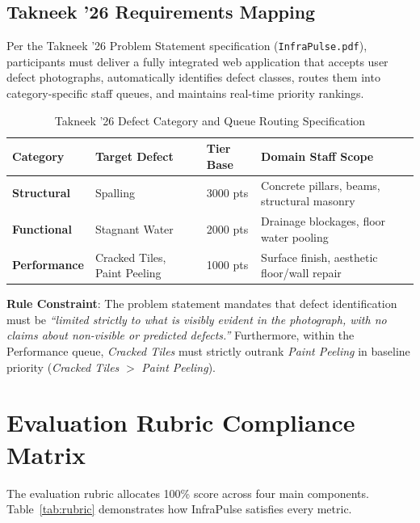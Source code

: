 \documentclass[11pt,a4paper]{article}
\begin{document}
\subsection{Takneek '26 Requirements Mapping}
Per the Takneek '26 Problem Statement specification (\texttt{InfraPulse.pdf}), participants must deliver a fully integrated web application that accepts user defect photographs, automatically identifies defect classes, routes them into category-specific staff queues, and maintains real-time priority rankings.

\begin{table}[H]
\centering
\caption{Takneek '26 Defect Category and Queue Routing Specification}
\label{tab:ps_spec}
\begin{tabular}{llll}
\toprule
\textbf{Category} & \textbf{Target Defect} & \textbf{Tier Base} & \textbf{Domain Staff Scope} \\
\midrule
\textbf{Structural} & Spalling & 3000 pts & Concrete pillars, beams, structural masonry \\
\textbf{Functional} & Stagnant Water & 2000 pts & Drainage blockages, floor water pooling \\
\textbf{Performance} & Cracked Tiles, Paint Peeling & 1000 pts & Surface finish, aesthetic floor/wall repair \\
\bottomrule
\end{tabular}
\end{table}

\textbf{Rule Constraint}: The problem statement mandates that defect identification must be \textit{``limited strictly to what is visibly evident in the photograph, with no claims about non-visible or predicted defects.''} Furthermore, within the Performance queue, \textit{Cracked Tiles} must strictly outrank \textit{Paint Peeling} in baseline priority (\textit{Cracked Tiles} $>$ \textit{Paint Peeling}).

\section{Evaluation Rubric Compliance Matrix}

The evaluation rubric allocates 100\% score across four main components. Table~\ref{tab:rubric} demonstrates how InfraPulse satisfies every metric.
\end{document}
